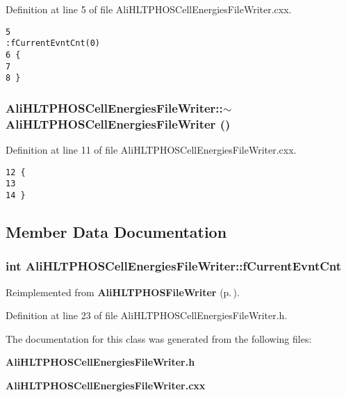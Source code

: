 Definition at line 5 of file Ali\-HLTPHOSCell\-Energies\-File\-Writer.cxx.

\footnotesize\begin{verbatim}5                                                                   :fCurrentEvntCnt(0)
6 {
7 
8 }
\end{verbatim}\normalsize 


\subsubsection{\setlength{\rightskip}{0pt plus 5cm}Ali\-HLTPHOSCell\-Energies\-File\-Writer::$\sim${\bf Ali\-HLTPHOSCell\-Energies\-File\-Writer} ()}\label{classAliHLTPHOSCellEnergiesFileWriter_a1}




Definition at line 11 of file Ali\-HLTPHOSCell\-Energies\-File\-Writer.cxx.

\footnotesize\begin{verbatim}12 {
13 
14 }
\end{verbatim}\normalsize 




\subsection{Member Data Documentation}
\subsubsection{\setlength{\rightskip}{0pt plus 5cm}int {\bf Ali\-HLTPHOSCell\-Energies\-File\-Writer::f\-Current\-Evnt\-Cnt}\hspace{0.3cm}{\tt  [private]}}\label{classAliHLTPHOSCellEnergiesFileWriter_r0}




Reimplemented from {\bf Ali\-HLTPHOSFile\-Writer} {\rm (p.\,\pageref{classAliHLTPHOSFileWriter_p0})}.

Definition at line 23 of file Ali\-HLTPHOSCell\-Energies\-File\-Writer.h.

The documentation for this class was generated from the following files:\begin{CompactItemize}
\item 
{\bf Ali\-HLTPHOSCell\-Energies\-File\-Writer.h}\item 
{\bf Ali\-HLTPHOSCell\-Energies\-File\-Writer.cxx}\end{CompactItemize}

